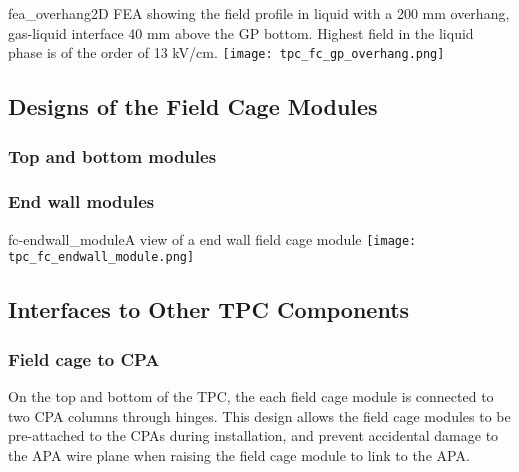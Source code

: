 \begin{cdrfigure}{fea_overhang}{2D FEA showing the field profile in liquid with a 200 mm overhang, gas-liquid interface 40 mm above the GP bottom. Highest field in the liquid phase is of the order of 13 kV/cm.}
\texttt{[image: tpc\_fc\_gp\_overhang.png]}
\end{cdrfigure}








\subsection{Designs of the Field Cage Modules}

\subsubsection{Top and bottom modules}




\subsubsection{End wall modules}

\begin{cdrfigure}{fc-endwall_module}{A view of a end wall field cage module}
\texttt{[image: tpc\_fc\_endwall\_module.png]}
\end{cdrfigure}


\subsection{Interfaces to Other TPC Components}

\subsubsection{Field cage to CPA}

On the top and bottom of the TPC, the each field cage module is connected to two CPA columns through hinges.  This design allows the field cage modules to be pre-attached to the CPAs during installation, and prevent accidental damage to the APA wire plane when raising the field cage module to link to the APA.

